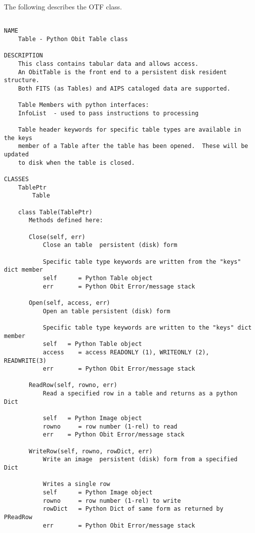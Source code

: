 \documentclass[11pt]{report}
\begin{document}
The following describes the OTF class.
\begin{verbatim}

NAME
    Table - Python Obit Table class

DESCRIPTION
    This class contains tabular data and allows access.
    An ObitTable is the front end to a persistent disk resident structure.
    Both FITS (as Tables) and AIPS cataloged data are supported.
    
    Table Members with python interfaces:
    InfoList  - used to pass instructions to processing
    
    Table header keywords for specific table types are available in the keys
    member of a Table after the table has been opened.  These will be updated
    to disk when the table is closed.

CLASSES
    TablePtr
        Table
    
    class Table(TablePtr)
       Methods defined here:
       
       Close(self, err)
           Close an table  persistent (disk) form
           
           Specific table type keywords are written from the "keys" dict member
           self      = Python Table object
           err       = Python Obit Error/message stack
       
       Open(self, access, err)
           Open an table persistent (disk) form
           
           Specific table type keywords are written to the "keys" dict member
           self   = Python Table object
           access    = access READONLY (1), WRITEONLY (2), READWRITE(3)
           err       = Python Obit Error/message stack
       
       ReadRow(self, rowno, err)
           Read a specified row in a table and returns as a python Dict
           
           self   = Python Image object
           rowno     = row number (1-rel) to read
           err    = Python Obit Error/message stack
       
       WriteRow(self, rowno, rowDict, err)
           Write an image  persistent (disk) form from a specified Dict
           
           Writes a single row
           self      = Python Image object
           rowno     = row number (1-rel) to write
           rowDict   = Python Dict of same form as returned by PReadRow
           err       = Python Obit Error/message stack
       

\end{verbatim}
\end{document}

